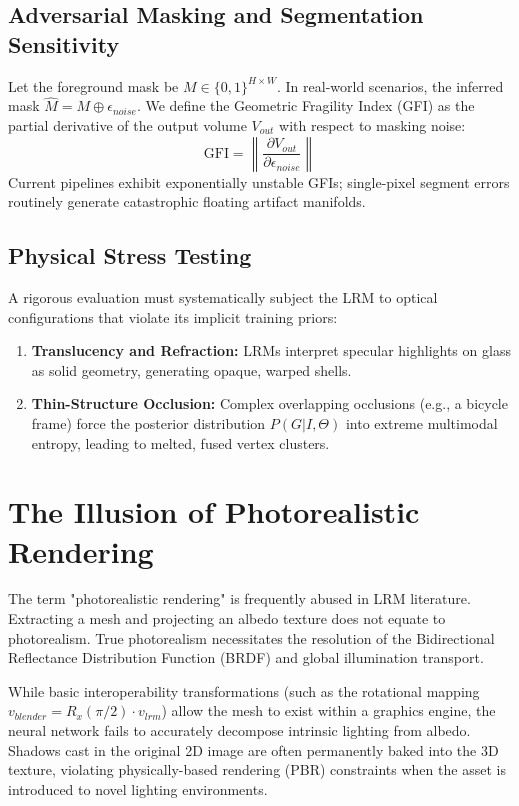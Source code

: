 \documentclass[10pt,journal,compsoc]{IEEEtran}
\begin{document}
\subsection{Adversarial Masking and Segmentation Sensitivity}
Let the foreground mask be $M \in \{0,1\}^{H \times W}$. In real-world scenarios, the inferred mask $\hat{M} = M \oplus \epsilon_{noise}$. We define the Geometric Fragility Index (GFI) as the partial derivative of the output volume $V_{out}$ with respect to masking noise:
\[ \text{GFI} = \left\| \frac{\partial V_{out}}{\partial \epsilon_{noise}} \right\| \]
Current pipelines exhibit exponentially unstable GFIs; single-pixel segment errors routinely generate catastrophic floating artifact manifolds.

\subsection{Physical Stress Testing}
A rigorous evaluation must systematically subject the LRM to optical configurations that violate its implicit training priors:
\begin{enumerate}
    \item \textbf{Translucency and Refraction:} LRMs interpret specular highlights on glass as solid geometry, generating opaque, warped shells.
    \item \textbf{Thin-Structure Occlusion:} Complex overlapping occlusions (e.g., a bicycle frame) force the posterior distribution $P(G | I, \Theta)$ into extreme multimodal entropy, leading to melted, fused vertex clusters.
\end{enumerate}

\section{The Illusion of Photorealistic Rendering}
The term "photorealistic rendering" is frequently abused in LRM literature. Extracting a mesh and projecting an albedo texture does not equate to photorealism. True photorealism necessitates the resolution of the Bidirectional Reflectance Distribution Function (BRDF) and global illumination transport.

While basic interoperability transformations (such as the rotational mapping $v_{blender} = R_x(\pi/2) \cdot v_{lrm}$) allow the mesh to exist within a graphics engine, the neural network fails to accurately decompose intrinsic lighting from albedo. Shadows cast in the original 2D image are often permanently baked into the 3D texture, violating physically-based rendering (PBR) constraints when the asset is introduced to novel lighting environments.
\end{document}
